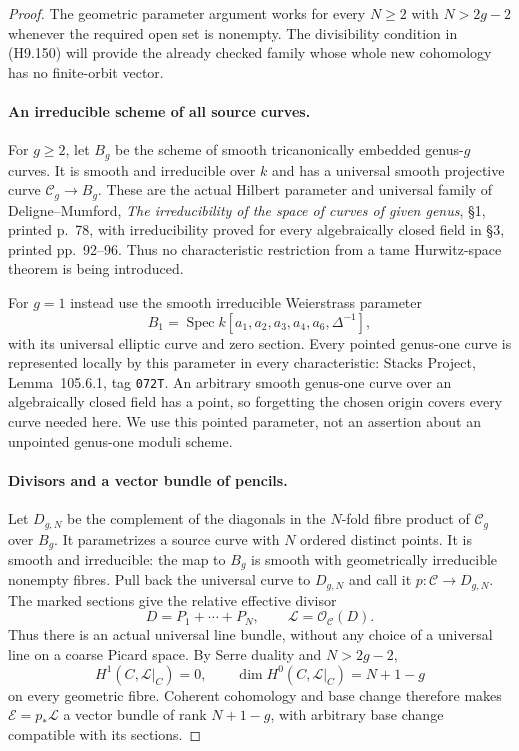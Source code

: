\begin{proof}
The geometric parameter argument works for every
$N\ge2$ with $N>2g-2$ whenever the required open
set is nonempty. The divisibility condition in
(H9.150) will provide the already checked family
whose whole new cohomology has no finite-orbit vector.

\paragraph{An irreducible scheme of all source curves.}
For $g\ge2$, let $B_g$ be the scheme of smooth
tricanonically embedded genus-$g$ curves. It is smooth
and irreducible over $k$ and has a universal smooth
projective curve $\mathscr C_g\to B_g$. These are the
actual Hilbert parameter and universal family of
Deligne--Mumford, \emph{The irreducibility of the space
of curves of given genus}, \S1, printed p.~78, with
irreducibility proved for every algebraically closed
field in \S3, printed pp.~92--96. Thus no
characteristic restriction from a tame Hurwitz-space
theorem is being introduced.

For $g=1$ instead use the smooth irreducible
Weierstrass parameter
\[
 B_1=\operatorname{Spec}
          k[a_1,a_2,a_3,a_4,a_6,\Delta^{-1}],
\]
with its universal elliptic curve and zero section.
Every pointed genus-one curve is represented locally
by this parameter in every characteristic: Stacks
Project, Lemma~105.6.1, tag \texttt{072T}.
An arbitrary smooth genus-one curve over an
algebraically closed field has a point, so forgetting
the chosen origin covers every curve needed here.
We use this pointed parameter, not an assertion
about an unpointed genus-one moduli scheme.

\paragraph{Divisors and a vector bundle of pencils.}
Let $D_{g,N}$ be the complement of the diagonals in
the $N$-fold fibre product of $\mathscr C_g$ over
$B_g$. It parametrizes a source curve with $N$
ordered distinct points. It is smooth and irreducible:
the map to $B_g$ is smooth with geometrically
irreducible nonempty fibres. Pull back the universal
curve to $D_{g,N}$ and call it
$p:\mathscr C\to D_{g,N}$. The marked sections give
the relative effective divisor
\[
                 D=P_1+\cdots+P_N,
                   \qquad \mathcal L=\mathcal O_{\mathscr C}(D).
                                                               \tag{H9.152}
\]
Thus there is an actual universal line bundle,
without any choice of a universal line on a coarse
Picard space. By Serre duality and $N>2g-2$,
\[
 H^1(C,\mathcal L|_C)=0,\qquad
 \dim H^0(C,\mathcal L|_C)=N+1-g
                                                               \tag{H9.153}
\]
on every geometric fibre. Coherent cohomology and
base change therefore makes $\mathcal E=p_*\mathcal L$
a vector bundle of rank $N+1-g$, with arbitrary
base change compatible with its sections.


\end{proof}

